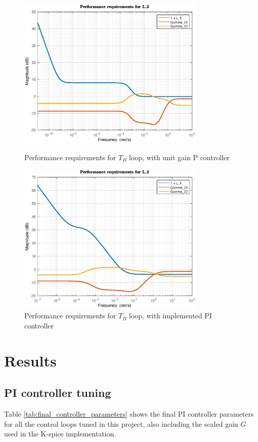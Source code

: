 \documentclass[12pt]{article}
\begin{document}
\begin{figure}[p]
\centering
\includegraphics[width=0.8\textwidth]{../Systemanalyse/Log_Data_to_Matlab/Figurer/LV_identifisering/L2_krav_P-reg.eps}
\caption{Performance requirements for $T_B$ loop, with unit gain P controller}
\label{fig:L2_performance1}

\includegraphics[width=0.8\textwidth]{../Systemanalyse/Log_Data_to_Matlab/Figurer/LV_identifisering/L2_krav_PI-reg.eps}
\caption{Performance requirements for $T_B$ loop, with implemented PI controller}
\label{fig:L2_performance2}
\end{figure}

\newpage
\section{Results}

\subsection{PI controller tuning}
Table \ref{tab:final_controller_parameters} shows the final PI controller parameters for all the control loops tuned in this project, also including the scaled gain $G$ used in the K-spice implementation.
\end{document}
